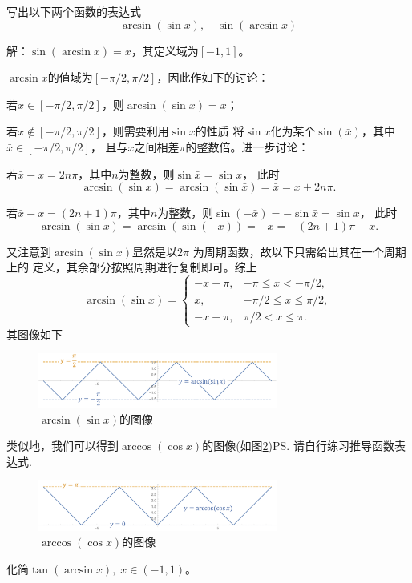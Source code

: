 \bs
\egz 写出以下两个函数的表达式
$$\arcsin(\sin x),\quad \sin(\arcsin x)$$

解：$\sin(\arcsin x)=x$，其定义域为$[-1,1]$。

$\arcsin x$的值域为$[-\pi/2,\pi/2]$，因此作如下的讨论：

若$x\in[-\pi/2,\pi/2]$，则$\arcsin(\sin x)=x$；

若$x\notin[-\pi/2,\pi/2]$，则需要利用$\sin x$的性质
将$\sin x$化为某个$\sin(\bar x)$，其中$\bar x\in[-\pi/2,\pi/2]$，
且与$x$之间相差$\pi$的整数倍。进一步讨论：

若$\bar x-x=2n\pi$，其中$n$为整数，则$\sin\bar x=\sin x$，
此时
$$\arcsin(\sin x)=\arcsin(\sin\bar x)=\bar x=x+2n\pi.$$

若$\bar x-x=(2n+1)\pi$，其中$n$为整数，则$\sin(-\bar x)
=-\sin\bar x=\sin x$，
此时
$$\arcsin(\sin x)=\arcsin(\sin(-\bar x))=-\bar x=-(2n+1)\pi-x.$$

又注意到$\arcsin(\sin x)$显然是以$2\pi$
为周期函数，故以下只需给出其在一个周期上的
定义，其余部分按照周期进行复制即可。综上
$$\arcsin(\sin x)=\left\{\begin{array}{ll}
-x-\pi, & -\pi\leq x<-\pi/2,\\
x, & -\pi/2\leq x\leq\pi/2,\\ 
-x+\pi, & \pi/2<x\leq\pi.
\end{array}\right.$$
其图像如下
\begin{figure}[h]
	\centering
	\includegraphics[width=0.7\textwidth]{./Images/Ch01/arcsin-sin.png}
	\caption{$\arcsin(\sin x)$的图像}
	\label{fig:arcsin-sin}
\end{figure}

类似地，我们可以得到$\arccos(\cos x)$的图像(如图\ref{fig:arccos-cos})\ps{请自行练习推导函数表达式}.
\begin{figure}[h]
	\centering
	\includegraphics[width=0.7\textwidth]{./Images/Ch01/arccos-cos.png}
	\caption{$\arccos(\cos x)$的图像}
	\label{fig:arccos-cos}
\end{figure}
\fin

\egz 化简$\tan(\arcsin x),\;x\in(-1,1)$。

